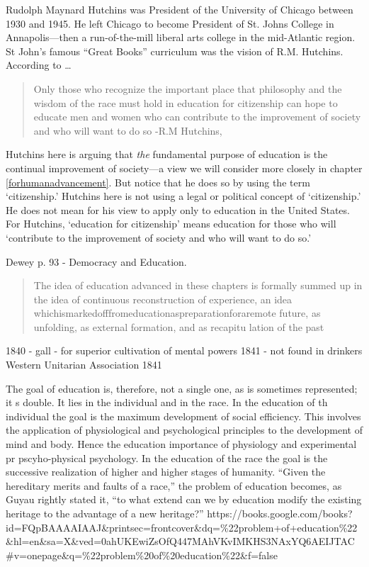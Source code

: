 Rudolph Maynard Hutchins was President of the University of Chicago between 1930 and 1945. He left Chicago to become President of St. Johns College in Annapolis---then a run-of-the-mill liberal arts college in the mid-Atlantic region. St John's famous ``Great Books'' curriculum was the vision of R.M. Hutchins. According to {\ldots}

\begin{quote}

Only those who recognize the important place that philosophy and the wisdom of the race must hold in education for citizenship can hope to educate men and women who can contribute to the improvement of society and who will want to do so -R.M Hutchins, ~\citep[p. 10]{Hutchins:1943ts}
\end{quote}

Hutchins here is arguing that \emph{the} fundamental purpose of education is the continual improvement of society---a view we will consider more closely in chapter \ref{forhumanadvancement}. But notice that he does so by using the term `citizenship.' Hutchins here is not using a legal or political concept of `citizenship.' He does not mean for his view to apply only to education in the United States. For Hutchins, `education for citizenship' means education for those who will `contribute to the improvement of society and who will want to do so.'

Dewey p. 93 - Democracy and Education.

\begin{quote}

The idea of education advanced in these chapters is formally summed up in the idea of continuous reconstruction of experience, an idea whichismarkedofffromeducationaspreparationforaremote future, as unfolding, as external formation, and as recapitu lation of the past 
\end{quote}

1840 - gall - for superior cultivation of mental powers
1841 - not found in drinkers
Western Unitarian Association 1841

The goal of education is, therefore, not a single one, as is sometimes represented; it s double. It lies in the individual and in the race. In the education of th individual the goal is the maximum development of social efficiency. This involves the application of physiological and psychological principles to the development of mind and body. Hence the education importance of physiology and experimental pr pscyho-physical psychology. In the education of the race the goal is the successive realization of higher and higher stages of humanity. ``Given the hereditary merits and faults of a race,'' the problem of education becomes, as Guyau rightly stated it, ``to what extend can we by education modify the existing heritage to the advantage of a new heritage?'' https:\slash \slash books.google.com\slash books?id=FQpBAAAAIAAJ\&printsec=frontcover\&dq=\%22problem+of+education\%22\&hl=en\&sa=X\&ved=0ahUKEwiZsOfQ447MAhVKvIMKHS3NAxYQ6AEIJTAC\#v=onepage\&q=\%22problem\%20of\%20education\%22\&f=false

